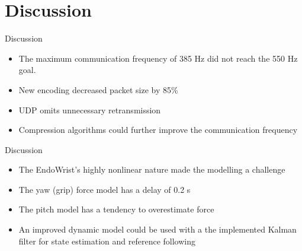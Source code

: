 \section{Discussion}
\begin{frame}{Discussion}{}


  \begin{itemize}
  	\item The maximum communication frequency of 385 Hz did not reach the 550 Hz goal.
  	\item New encoding  decreased packet size by 85\%
  	\item UDP omits unnecessary retransmission
  	\item Compression algorithms could further improve the communication frequency

  	
   
  \end{itemize}


\end{frame}

\begin{frame}{Discussion}{}
	
	
	\begin{itemize}
		\item The EndoWrist's highly nonlinear nature made the modelling a challenge
		\item The yaw (grip) force model has a delay of 0.2 s 
		\item The pitch model has a tendency to overestimate force
		\item An improved dynamic model could be used with a the implemented Kalman filter for state estimation and reference following
	\end{itemize}
	
	
\end{frame}




